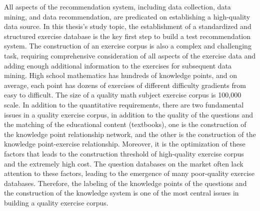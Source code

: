 All aspects of the recommendation system, including data collection, data mining, and data recommendation, are predicated on establishing a high-quality data source. In this thesis's study topic, the establishment of a standardized and structured exercise database is the key first step to build a test recommendation system. The construction of an exercise corpus is also a complex and challenging task, requiring comprehensive consideration of all aspects of the exercise data and adding enough additional information to the exercises for subsequent data mining. High school mathematics has hundreds of knowledge points, and on average, each point has dozens of exercises of different difficulty gradients from easy to difficult. The size of a quality math subject exercise corpus is 100,000 scale. In addition to the quantitative requirements, there are two fundamental issues in a quality exercise corpus, in addition to the quality of the questions and the matching of the educational content (textbooks), one is the construction of the knowledge point relationship network, and the other is the construction of the knowledge point-exercise relationship. Moreover, it is the optimization of these factors that leads to the construction threshold of high-quality exercise corpus and the extremely high cost. The question databases on the market often lack attention to these factors, leading to the emergence of many poor-quality exercise databases. Therefore, the labeling of the knowledge points of the questions and the construction of the knowledge system is one of the most central issues in building a quality exercise corpus.


